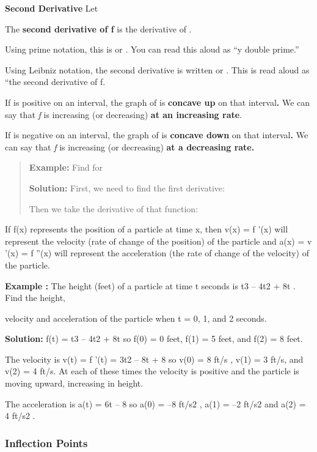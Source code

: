 \textbf{Second Derivative} Let

The \textbf{second derivative of f} is the derivative of .

Using prime notation, this is or . You can read this aloud as ``y double
prime.''

Using Leibniz notation, the second derivative is written or . This is
read aloud as ``the second derivative of f.

If is positive on an interval, the graph of is \textbf{concave up} on
that interval\textbf{.} We can say that \emph{f} is increasing (or
decreasing) \textbf{at an increasing rate}.

If is negative on an interval, the graph of is \textbf{concave down} on
that interval\textbf{.} We can say that \emph{f} is increasing (or
decreasing) \textbf{at a decreasing rate.}

\begin{quote}
\textbf{Example:} Find for

\textbf{Solution:} First, we need to find the first derivative:

Then we take the derivative of that function:
\end{quote}

If f(x) represents the position of a particle at time x, then v(x) = f
'(x) will represent the velocity (rate of change of the position) of the
particle and a(x) = v '(x) = f ''(x) will represent the acceleration
(the rate of change of the velocity) of the particle.

\textbf{Example :} The height (feet) of a particle at time t seconds is
t3 -- 4t2 + 8t . Find the height,

velocity and acceleration of the particle when t = 0, 1, and 2 seconds.

\textbf{Solution:} f(t) = t3 -- 4t2 + 8t so f(0) = 0 feet, f(1) = 5
feet, and f(2) = 8 feet.

The velocity is v(t) = f '(t) = 3t2 -- 8t + 8 so v(0) = 8 ft/s , v(1) =
3 ft/s, and v(2) = 4 ft/s. At each of these times the velocity is
positive and the particle is moving upward, increasing in height.

The acceleration is a(t) = 6t -- 8 so a(0) = --8 ft/s2 , a(1) = --2
ft/s2 and a(2) = 4 ft/s2 .

\subsubsection{Inflection Points}\label{inflection-points}

